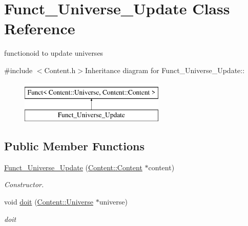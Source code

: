 \hypertarget{classFunct__Universe__Update}{
\section{Funct\_\-Universe\_\-Update Class Reference}
\label{classFunct__Universe__Update}
}


functionoid to update universes  


{\ttfamily \#include $<$Content.h$>$}Inheritance diagram for Funct\_\-Universe\_\-Update::\begin{figure}[H]
\begin{center}
\leavevmode
\includegraphics[height=2cm]{classFunct__Universe__Update}
\end{center}
\end{figure}
\subsection*{Public Member Functions}
\begin{DoxyCompactItemize}
\item 
\hypertarget{classFunct__Universe__Update_aefda6a4784a2ca823c4c18c511900ad3}{
\hyperlink{classFunct__Universe__Update_aefda6a4784a2ca823c4c18c511900ad3}{Funct\_\-Universe\_\-Update} (\hyperlink{classContent_1_1Content}{Content::Content} $\ast$content)}
\label{classFunct__Universe__Update_aefda6a4784a2ca823c4c18c511900ad3}

\begin{DoxyCompactList}\small\item\em Constructor. \item\end{DoxyCompactList}\item 
\hypertarget{classFunct__Universe__Update_aaf20190723aea78ef2a9b9bf3f567373}{
void \hyperlink{classFunct__Universe__Update_aaf20190723aea78ef2a9b9bf3f567373}{doit} (\hyperlink{classContent_1_1Universe}{Content::Universe} $\ast$universe)}
\label{classFunct__Universe__Update_aaf20190723aea78ef2a9b9bf3f567373}

\begin{DoxyCompactList}\small\item\em doit \item\end{DoxyCompactList}\end{DoxyCompactItemize}


